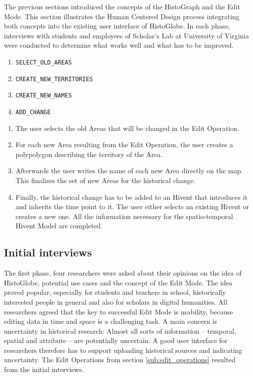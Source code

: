 The previous sections introduced the concepts of the HistoGraph and the Edit Mode. This section illustrates the Human Centered Design process integrating both concepts into the existing user interface of HistoGlobe. In each phase, interviews with students and employees of Scholar's Lab at University of Virginia were conducted to determine what works well and what has to be improved.

\begin{enumerate}
  \item \texttt{SELECT\_OLD\_AREAS}
  \item \texttt{CREATE\_NEW\_TERRITORIES}
  \item \texttt{CREATE\_NEW\_NAMES}
  \item \texttt{ADD\_CHANGE}
\end{enumerate}
\begin{enumerate}
  \item The user selects the old Areas that will be changed in the Edit Operation.
  \item For each new Area resulting from the Edit Operation, the user creates a polypolygon describing the territory of the Area.
  \item Afterwards the user writes the name of each new Area directly on the map. This finalizes the set of new Areas for the historical change.
  \item Finally, the historical change has to be added to an Hivent that introduces it and inherits the time point to it. The user either selects an existing Hivent or creates a new one. All the information necessary for the spatio-temporal Hivent Model are completed.
\end{enumerate}
\subsection{Initial interviews} %
\label{sub:initial_interviews}

The first phase, four researchers were asked about their opinions on the idea of HistoGlobe, potential use cases and the concept of the Edit Mode. The idea proved popular, especially for students and teachers in school, historically interested people in general and also for scholars in digital humanities. All researchers agreed that the key to successful Edit Mode is usability, because editing data in time and space is a challenging task. A main concern is uncertainty in historical research: Almost all sorts of information -- temporal, spatial and attribute -- are potentially uncertain. A good user interface for researchers therefore has to support uploading historical sources and indicating uncertainty. The Edit Operations from section \ref{sub:edit_operations} resulted from the initial interviews.

